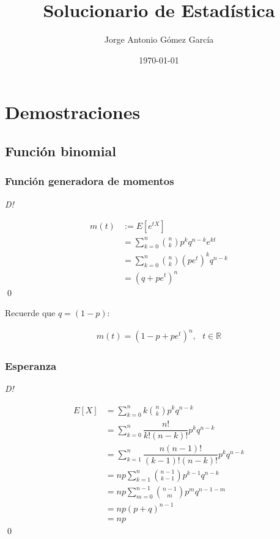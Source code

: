 \documentclass[8pt]{article}
\title{Solucionario de Estadística}
\author{Jorge Antonio Gómez García}
\date{\today}
\begin{document}
\maketitle

\tableofcontents

\section{Demostraciones}

    \subsection{Función binomial}
    
    \subsubsection{Función generadora de momentos}

    \textit{D!}
    
    \begin{align*}
        m(t) &:= E[e^{tX}] \\
            &= \sum^n_{k=0}\binom{n}{k}p^kq^{n-k}e^{kt} \\
            &= \sum^n_{k=0}\binom{n}{k}(pe^t)^kq^{n-k} \\
            &= (q+pe^t)^n
    \end{align*}\qed

    Recuerde que $q = (1-p)$:
    
    \begin{align*}
        m(t) = (1-p+pe^t)^n, \,\,\,\, t\in\mathbb{R}
    \end{align*}

    
    
    \subsubsection{Esperanza}
    
    \textit{D!}
    
    \begin{align*}
        E[X] &= \sum^n_{k=0} k\binom{n}{k}p^kq^{n-k} \\
            &= \sum^n_{k=0} \dfrac{n!}{k!(n-k)!} p^kq^{n-k} \\
            &= \sum^n_{k=1}\dfrac{n(n-1)!}{(k-1)!(n-k)!}p^kq^{n-k}  \\
            &= np \sum^n_{k=1} \binom{n-1}{k-1}p^{k-1}q^{n-k} \\
            &= np \sum^{n-1}_{m=0} \binom{n-1}{m} p^{m}q^{n-1-m} \\
            &= np(p+q)^{n-1} \\
            &= np
    \end{align*}\qed
\end{document}
